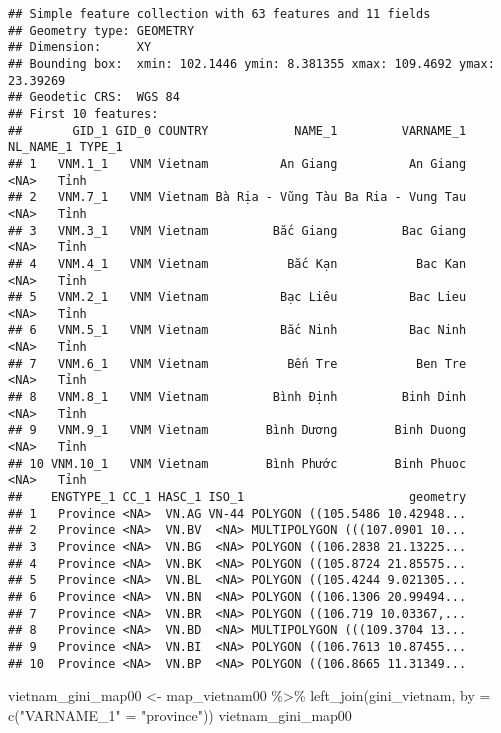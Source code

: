\documentclass[
]{article}
\newenvironment{Shaded}{\begin{snugshade}}{\end{snugshade}}
\newcommand{\AttributeTok}[1]{\textcolor[rgb]{0.77,0.63,0.00}{#1}}
\newcommand{\FunctionTok}[1]{\textcolor[rgb]{0.00,0.00,0.00}{#1}}
\newcommand{\NormalTok}[1]{#1}
\newcommand{\OtherTok}[1]{\textcolor[rgb]{0.56,0.35,0.01}{#1}}
\newcommand{\SpecialCharTok}[1]{\textcolor[rgb]{0.00,0.00,0.00}{#1}}
\newcommand{\StringTok}[1]{\textcolor[rgb]{0.31,0.60,0.02}{#1}}
\begin{document}
\begin{verbatim}
## Simple feature collection with 63 features and 11 fields
## Geometry type: GEOMETRY
## Dimension:     XY
## Bounding box:  xmin: 102.1446 ymin: 8.381355 xmax: 109.4692 ymax: 23.39269
## Geodetic CRS:  WGS 84
## First 10 features:
##       GID_1 GID_0 COUNTRY            NAME_1         VARNAME_1 NL_NAME_1 TYPE_1
## 1   VNM.1_1   VNM Vietnam          An Giang          An Giang      <NA>   Tỉnh
## 2   VNM.7_1   VNM Vietnam Bà Rịa - Vũng Tàu Ba Ria - Vung Tau      <NA>   Tỉnh
## 3   VNM.3_1   VNM Vietnam         Bắc Giang         Bac Giang      <NA>   Tỉnh
## 4   VNM.4_1   VNM Vietnam           Bắc Kạn           Bac Kan      <NA>   Tỉnh
## 5   VNM.2_1   VNM Vietnam          Bạc Liêu          Bac Lieu      <NA>   Tỉnh
## 6   VNM.5_1   VNM Vietnam          Bắc Ninh          Bac Ninh      <NA>   Tỉnh
## 7   VNM.6_1   VNM Vietnam           Bến Tre           Ben Tre      <NA>   Tỉnh
## 8   VNM.8_1   VNM Vietnam         Bình Định         Binh Dinh      <NA>   Tỉnh
## 9   VNM.9_1   VNM Vietnam        Bình Dương        Binh Duong      <NA>   Tỉnh
## 10 VNM.10_1   VNM Vietnam        Bình Phước        Binh Phuoc      <NA>   Tỉnh
##    ENGTYPE_1 CC_1 HASC_1 ISO_1                       geometry
## 1   Province <NA>  VN.AG VN-44 POLYGON ((105.5486 10.42948...
## 2   Province <NA>  VN.BV  <NA> MULTIPOLYGON (((107.0901 10...
## 3   Province <NA>  VN.BG  <NA> POLYGON ((106.2838 21.13225...
## 4   Province <NA>  VN.BK  <NA> POLYGON ((105.8724 21.85575...
## 5   Province <NA>  VN.BL  <NA> POLYGON ((105.4244 9.021305...
## 6   Province <NA>  VN.BN  <NA> POLYGON ((106.1306 20.99494...
## 7   Province <NA>  VN.BR  <NA> POLYGON ((106.719 10.03367,...
## 8   Province <NA>  VN.BD  <NA> MULTIPOLYGON (((109.3704 13...
## 9   Province <NA>  VN.BI  <NA> POLYGON ((106.7613 10.87455...
## 10  Province <NA>  VN.BP  <NA> POLYGON ((106.8665 11.31349...
\end{verbatim}

\begin{Shaded}
\begin{Highlighting}[]
\NormalTok{vietnam\_gini\_map00 }\OtherTok{\textless{}{-}}\NormalTok{ map\_vietnam00 }\SpecialCharTok{\%\textgreater{}\%} \FunctionTok{left\_join}\NormalTok{(gini\_vietnam, }\AttributeTok{by =} \FunctionTok{c}\NormalTok{(}\StringTok{"VARNAME\_1"} \OtherTok{=} \StringTok{"province"}\NormalTok{))}
\NormalTok{vietnam\_gini\_map00}
\end{Highlighting}
\end{Shaded}
\end{document}
